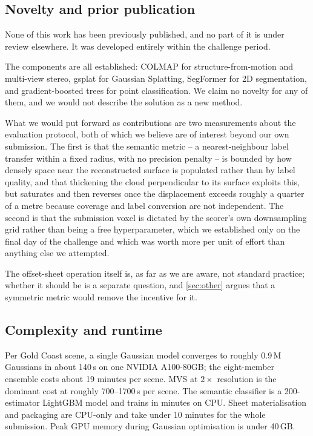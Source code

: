 \documentclass[10pt,twocolumn,letterpaper]{article}
\begin{document}
\subsection{Novelty and prior publication}

None of this work has been previously published, and no part of it is under
review elsewhere. It was developed entirely within the challenge period.

The components are all established: COLMAP for structure-from-motion and
multi-view stereo, gsplat for Gaussian Splatting, SegFormer for 2D segmentation,
and gradient-boosted trees for point classification. We claim no novelty for any
of them, and we would not describe the solution as a new method.

What we would put forward as contributions are two measurements about the
evaluation protocol, both of which we believe are of interest beyond our own
submission. The first is that the semantic metric -- a nearest-neighbour label
transfer within a fixed radius, with no precision penalty -- is bounded by how
densely space near the reconstructed surface is populated rather than by label
quality, and that thickening the cloud perpendicular to its surface exploits
this, but saturates and then reverses once the displacement exceeds roughly a
quarter of a metre because coverage and label conversion are not independent.
The second is that the submission voxel is dictated by the scorer's own
downsampling grid rather than being a free hyperparameter, which we established
only on the final day of the challenge and which was worth more per unit of
effort than anything else we attempted.

The offset-sheet operation itself is, as far as we are aware, not standard
practice; whether it should be is a separate question, and \cref{sec:other}
argues that a symmetric metric would remove the incentive for it.

\subsection{Complexity and runtime}

Per Gold Coast scene, a single Gaussian model converges to roughly 0.9\,M
Gaussians in about 140\,s on one NVIDIA A100-80GB; the eight-member ensemble
costs about 19 minutes per scene. MVS at $2\times$ resolution is the dominant
cost at roughly 700--1700\,s per scene. The semantic classifier is a
200-estimator LightGBM model and trains in minutes on CPU. Sheet materialisation
and packaging are CPU-only and take under 10 minutes for the whole submission.
Peak GPU memory during Gaussian optimisation is under 40\,GB.
\end{document}
